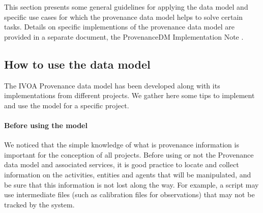 %

This section presents some general guidelines for applying the data model and
specific use cases for which the provenance data model helps to solve certain tasks. Details on specific implementions of the provenance data model are provided in a separate document, the ProvenanceDM Implementation Note \citep{std:ProvenanceImplementationNote}.


\subsection{How to use the data model}

The IVOA Provenance data model has been developed along with its implementations from different projects. We gather here some tips to implement and use the model for a specific project.

\paragraph{Before using the model}
We noticed that the simple knowledge of what is provenance information is important for the conception of all projects. Before using or not the Provenance data model and associated services, it is good practice to locate and collect information on the activities, entities and agents that will be manipulated, and be sure that this information is not lost along the way. For example, a script may use intermediate files (such as calibration files for observations) that may not be tracked by the system.

